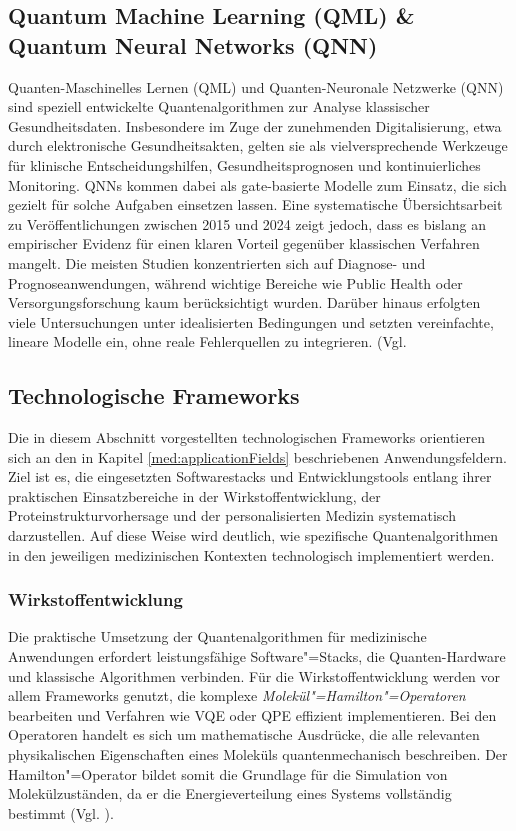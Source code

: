 \subsection{Quantum Machine Learning (QML) \& Quantum Neural Networks (QNN)}
Quanten-Maschinelles Lernen (QML) und Quanten-Neuronale Netzwerke (QNN) sind speziell entwickelte Quantenalgorithmen zur Analyse klassischer Gesundheitsdaten. Insbesondere im Zuge der zunehmenden Digitalisierung, etwa durch elektronische Gesundheitsakten, gelten sie als vielversprechende Werkzeuge für klinische Entscheidungshilfen, Gesundheitsprognosen und kontinuierliches Monitoring. QNNs kommen dabei als gate-basierte Modelle zum Einsatz, die sich gezielt für solche Aufgaben einsetzen lassen. Eine systematische Übersichtsarbeit zu Veröffentlichungen zwischen 2015 und 2024 zeigt jedoch, dass es bislang an empirischer Evidenz für einen klaren Vorteil gegenüber klassischen Verfahren mangelt. Die meisten Studien konzentrierten sich auf Diagnose- und Prognoseanwendungen, während wichtige Bereiche wie Public Health oder Versorgungsforschung kaum berücksichtigt wurden. Darüber hinaus erfolgten viele Untersuchungen unter idealisierten Bedingungen und setzten vereinfachte, lineare Modelle ein, ohne reale Fehlerquellen zu integrieren. (Vgl. \cite{gupta_systematic_2025}

\subsection{Technologische Frameworks}
Die in diesem Abschnitt vorgestellten technologischen Frameworks orientieren sich an den in Kapitel \ref{med:applicationFields} beschriebenen Anwendungsfeldern. Ziel ist es, die eingesetzten Softwarestacks und Entwicklungstools entlang ihrer praktischen Einsatzbereiche in der Wirkstoffentwicklung, der Proteinstrukturvorhersage und der personalisierten Medizin systematisch darzustellen. Auf diese Weise wird deutlich, wie spezifische Quantenalgorithmen in den jeweiligen medizinischen Kontexten technologisch implementiert werden.\\

\subsubsection*{Wirkstoffentwicklung}
Die praktische Umsetzung der Quantenalgorithmen für medizinische Anwendungen erfordert leistungsfähige Software"=Stacks, die Quanten-Hardware und klassische Algorithmen verbinden. Für die Wirkstoffentwicklung werden vor allem Frameworks genutzt, die komplexe \textit{Molekül"=Hamilton"=Operatoren} bearbeiten und Verfahren wie VQE oder QPE effizient implementieren. Bei den Operatoren handelt es sich um mathematische Ausdrücke, die alle relevanten physikalischen Eigenschaften eines Moleküls quantenmechanisch beschreiben. Der Hamilton"=Operator bildet somit die Grundlage für die Simulation von Molekülzuständen, da er die Energieverteilung eines Systems vollständig bestimmt (Vgl. \cite{mcardle}).\\

